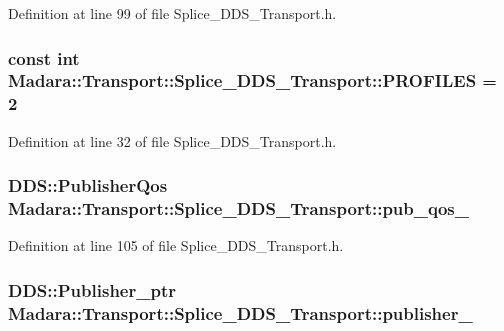 Definition at line 99 of file Splice\_\-DDS\_\-Transport.h.

\hypertarget{classMadara_1_1Transport_1_1Splice__DDS__Transport_a06119964eed25f18948a4d6c68b0e7e8}{
\subsubsection[{PROFILES}]{\setlength{\rightskip}{0pt plus 5cm}const int {\bf Madara::Transport::Splice\_\-DDS\_\-Transport::PROFILES} = 2}}
\label{d0/d91/classMadara_1_1Transport_1_1Splice__DDS__Transport_a06119964eed25f18948a4d6c68b0e7e8}


Definition at line 32 of file Splice\_\-DDS\_\-Transport.h.

\hypertarget{classMadara_1_1Transport_1_1Splice__DDS__Transport_a2646428c9bdc4681983e1ad98c188176}{
\subsubsection[{pub\_\-qos\_\-}]{\setlength{\rightskip}{0pt plus 5cm}DDS::PublisherQos {\bf Madara::Transport::Splice\_\-DDS\_\-Transport::pub\_\-qos\_\-}}}
\label{d0/d91/classMadara_1_1Transport_1_1Splice__DDS__Transport_a2646428c9bdc4681983e1ad98c188176}


Definition at line 105 of file Splice\_\-DDS\_\-Transport.h.

\hypertarget{classMadara_1_1Transport_1_1Splice__DDS__Transport_a7238303bb1ebaa6f577685282114938d}{
\subsubsection[{publisher\_\-}]{\setlength{\rightskip}{0pt plus 5cm}DDS::Publisher\_\-ptr {\bf Madara::Transport::Splice\_\-DDS\_\-Transport::publisher\_\-}}}
\label{d0/d91/classMadara_1_1Transport_1_1Splice__DDS__Transport_a7238303bb1ebaa6f577685282114938d}


